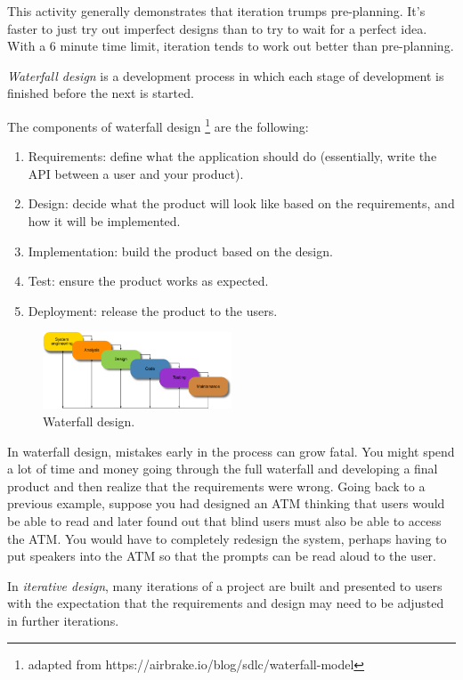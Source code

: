 This activity generally demonstrates that iteration trumps pre-planning. It's faster to just try out imperfect designs than to try to wait for a perfect idea. With a 6 minute time limit, iteration tends to work out better than pre-planning. 

\begin{definition}
\emph{Waterfall design} is a development process in which each stage of development is finished before the next is started. 
\end{definition}

The components of waterfall design \footnote{adapted from https://airbrake.io/blog/sdlc/waterfall-model} are the following:
\begin{enumerate}
	\item Requirements: define what the application should do (essentially, write the API between a user and your product).
	\item Design: decide what the product will look like based on the requirements, and how it will be implemented.
	\item Implementation: build the product based on the design.
	\item Test: ensure the product works as expected.
	\item Deployment: release the product to the users.
\end{enumerate}

\begin{figure}
	\centering
	\includegraphics[width=0.5\textwidth]{images/waterfall.png}
	\caption{Waterfall design.}
\end{figure}

In waterfall design, mistakes early in the process can grow fatal. You might spend a lot of time and money going through the full waterfall and developing a final product and then realize that the requirements were wrong. Going back to a previous example, suppose you had designed an ATM thinking that users would be able to read and later found out that blind users must also be able to access the ATM. You would have to completely redesign the system, perhaps having to put speakers into the ATM so that the prompts can be read aloud to the user. 

\begin{definition}
In \emph{iterative design}, many iterations of a project are built and presented to users with the expectation that the requirements and design may need to be adjusted in further iterations. 
\end{definition}

